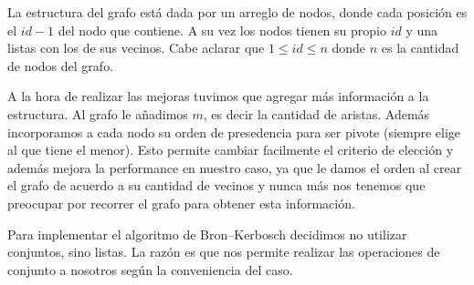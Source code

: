 La estructura del grafo está dada por un arreglo de nodos, donde cada posición es el $id-1$ del nodo que contiene. A su vez los nodos tienen su propio $id$ y una listas con los de sus vecinos. Cabe aclarar que $1 \leq id \leq n$ donde $n$ es la cantidad de nodos del grafo.

A la hora de realizar las mejoras tuvimos que agregar más información a la estructura. Al grafo le añadimos $m$, es decir la cantidad de aristas. Además incorporamos a cada nodo su orden de presedencia para ser pivote (siempre elige al que tiene el menor). Esto permite cambiar facilmente el criterio de elección y además mejora la performance en nuestro caso, ya que le damos el orden al crear el grafo de acuerdo a su cantidad de vecinos y nunca más nos tenemos que preocupar por recorrer el grafo para obtener esta información. 

Para implementar el algoritmo de Bron–Kerbosch decidimos no utilizar conjuntos, sino listas. La razón es que nos permite realizar las operaciones de conjunto a nosotros según la conveniencia del caso.
